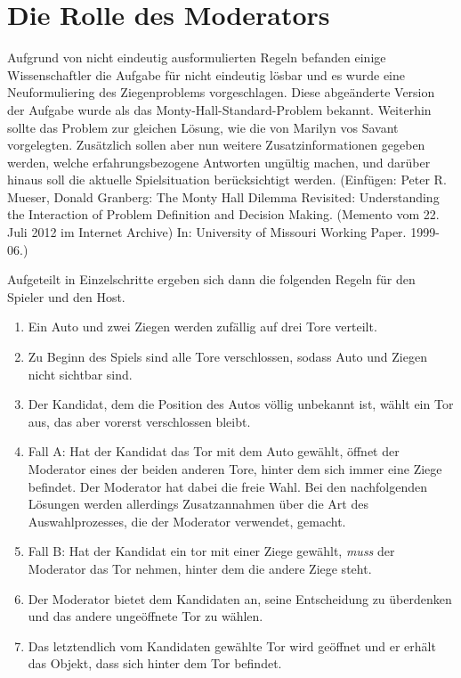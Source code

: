 \chapter{Die Rolle des Moderators}

Aufgrund von nicht eindeutig ausformulierten Regeln befanden einige Wissenschaftler die Aufgabe für nicht eindeutig lösbar und es wurde eine Neuformuliering des
Ziegenproblems vorgeschlagen. Diese abgeänderte Version der Aufgabe wurde als das Monty-Hall-Standard-Problem bekannt. Weiterhin sollte das Problem zur gleichen
Lösung, wie die von Marilyn vos Savant vorgelegten. Zusätzlich sollen aber nun weitere Zusatzinformationen gegeben werden, welche erfahrungsbezogene Antworten ungültig
machen, und darüber hinaus soll die aktuelle Spielsituation berücksichtigt werden. (Einfügen:  Peter R. Mueser, Donald Granberg: The Monty Hall Dilemma Revisited: Understanding the Interaction of Problem Definition and Decision Making. (Memento vom 22. Juli 2012 im Internet Archive) In: University of Missouri Working Paper. 1999-06.)

Aufgeteilt in Einzelschritte ergeben sich dann die folgenden Regeln für den Spieler und den Host.
\begin{enumerate}
    \item Ein Auto und zwei Ziegen werden zufällig auf drei Tore verteilt.
    \item Zu Beginn des Spiels sind alle Tore verschlossen, sodass Auto und Ziegen nicht sichtbar sind.
    \item Der Kandidat, dem die Position des Autos völlig unbekannt ist, wählt ein Tor aus, das aber vorerst verschlossen bleibt.
    \item Fall A: Hat der Kandidat das Tor mit dem Auto gewählt, öffnet der Moderator eines der beiden anderen Tore, hinter dem sich immer eine Ziege befindet. 
    Der Moderator hat dabei die freie Wahl. Bei den nachfolgenden Lösungen werden allerdings Zusatzannahmen über die Art des Auswahlprozesses, die der Moderator
    verwendet, gemacht.
    \item Fall B: Hat der Kandidat ein tor mit einer Ziege gewählt, \textit{muss} der Moderator das Tor nehmen, hinter dem die andere Ziege steht.
    \item Der Moderator bietet dem Kandidaten an, seine Entscheidung zu überdenken und das andere ungeöffnete Tor zu wählen.
    \item Das letztendlich vom Kandidaten gewählte Tor wird geöffnet und er erhält das Objekt, dass sich hinter dem Tor befindet.
\end{enumerate}

